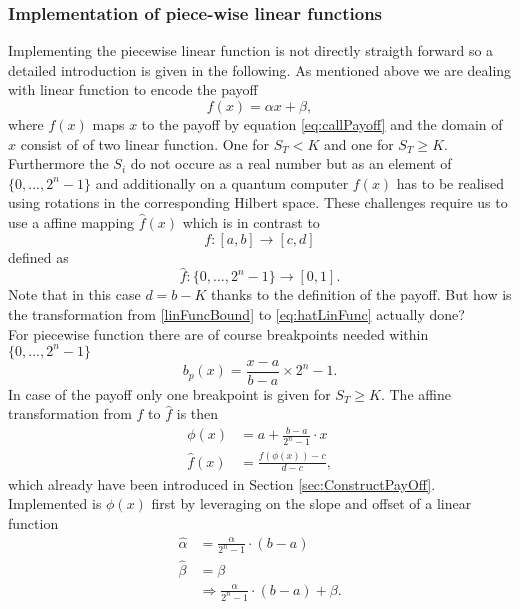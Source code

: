 \documentclass[../../main.tex]{subfiles}
\begin{document}
\subsubsection{Implementation of piece-wise linear functions}\label{sec:ImplPieceFunc}

Implementing the piecewise linear function is not directly straigth forward so a detailed introduction is given in the following. 
As mentioned above we are dealing with linear function to encode the payoff
\begin{equation}\label{eq:defLinearFunc}
  f(x) = \alpha x + \beta,
\end{equation}
where $f(x)$ maps $x$ to the payoff by equation \ref{eq:callPayoff} and the domain of $x$ consist of of two linear function. One for $S_T < K$ and one for $S_T \geq K$. 
Furthermore the $S_i$ do not occure as a real number but as an element of $\{ 0,...,2^n-1 \}$ and additionally on a quantum computer $f(x)$ has to be realised
using rotations in the corresponding Hilbert space. 
These challenges require us to use a affine mapping $\hat{f}(x)$ which is in contrast to
\begin{equation}\label{eq:linFuncBound}
  f: [ a,b ] \rightarrow [ c,d ]
\end{equation}
defined as
\begin{equation}\label{eq:hatLinFunc}
  \hat{f}: \{0,...,2^n-1 \} \rightarrow [ 0,1 ].
\end{equation}
Note that in this case $d=b-K$ thanks to the definition of the payoff. But how is the transformation from \ref{linFuncBound}
to \ref{eq:hatLinFunc} actually done?\\
For piecewise function there are of course breakpoints needed within $\{ 0,...,2^n-1 \}$
\begin{equation}\label{eq:breakpoints}
b_p(x) = \frac{x-a}{b-a} \times 2^n-1.
\end{equation}
In case of the payoff only one breakpoint is given for $ S_T \geq K $.
The affine transformation from $f$ to $\hat{f}$ is then
\begin{align}\label{eq:affinTransform}
  \phi(x) &= a + \frac{b-a}{2^n-1} \cdot x \\
  \hat{f}(x) &= \frac{f(\phi(x))-c}{d-c},
\end{align}
which already have been introduced in Section \ref{sec:ConstructPayOff}.\\
Implemented is $\phi(x)$ first by leveraging on the slope and offset of a linear function
\begin{align}\label{eq:mappedSlopeOffset}
  \hat{\alpha} &= \frac{\alpha}{2^n-1} \cdot (b-a)\\
  \hat{\beta} &= \beta\\
  &\Rightarrow \frac{\alpha}{2^n-1} \cdot (b-a) + \beta.
\end{align}
\end{document}

